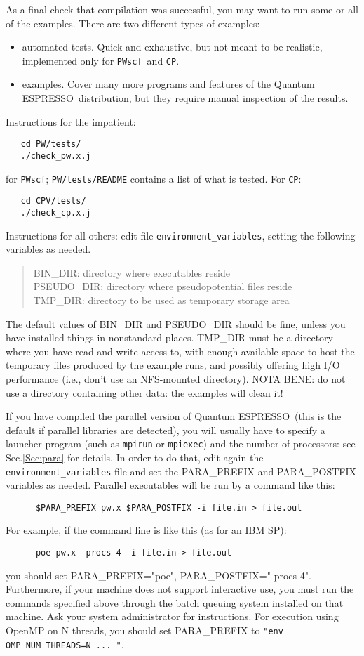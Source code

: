 \documentclass[12pt,a4paper]{article}
\def\qe{{\sc Quantum ESPRESSO}}
\def\PWscf{\texttt{PWscf}}
\def\CP{\texttt{CP}}
\begin{document}
As a final check that compilation was successful, you may want to run some or
all of the examples. There are two different types of examples: 
\begin{itemize}
\item automated tests. Quick and exhaustive, but not
meant to be realistic, implemented only for \PWscf\ and \CP.
\item examples.
Cover many more programs and features of the \qe\ distribution,
but they require manual inspection of the results. 
\end{itemize}
Instructions for the impatient:
\begin{verbatim}
   cd PW/tests/
   ./check_pw.x.j
\end{verbatim}
for \PWscf;
\texttt{PW/tests/README} contains a list of what is tested.
For \CP:
\begin{verbatim}
   cd CPV/tests/
   ./check_cp.x.j
\end{verbatim}
Instructions for all others: edit file \texttt{environment\_variables},
setting the following variables as needed.
\begin{quote}
   BIN\_DIR: directory where executables reside\\
   PSEUDO\_DIR: directory where pseudopotential files reside\\
   TMP\_DIR: directory to be used as temporary storage area
\end{quote}
The default values of BIN\_DIR and PSEUDO\_DIR should be fine, 
unless you have installed things in nonstandard places. TMP\_DIR 
must be a directory where you have read and write access to, with 
enough available space to host the temporary files produced by the 
example runs, and possibly offering high I/O performance (i.e., don't 
use an NFS-mounted directory). NOTA BENE: do not use a
directory containing other data: the examples will clean it!

If you have compiled the parallel version of \qe\ (this
is the default if parallel libraries are detected), you will usually
have to specify a launcher program (such as \texttt{mpirun} or 
\texttt{mpiexec}) and the number of processors: see Sec.\ref{Sec:para} for
details. In order to do that, edit again the \texttt{environment\_variables} 
file
and set the PARA\_PREFIX and PARA\_POSTFIX variables as needed. 
Parallel executables will be run by a command like this: 
\begin{verbatim}
      $PARA_PREFIX pw.x $PARA_POSTFIX -i file.in > file.out
\end{verbatim}
For example, if the command line is like this (as for an IBM SP):
\begin{verbatim}
      poe pw.x -procs 4 -i file.in > file.out
\end{verbatim}
you should set PARA\_PREFIX="poe", PARA\_POSTFIX="-procs
4". Furthermore, if your machine does not support interactive use, you
must run the commands specified above through the batch queuing
system installed on that machine. Ask your system administrator for
instructions. For execution using OpenMP on N threads, 
you should set PARA\_PREFIX to \texttt{"env OMP\_NUM\_THREADS=N ... "}.
\end{document}

